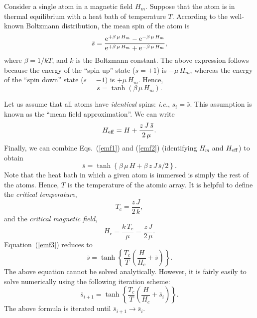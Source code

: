 Consider a single atom in a magnetic field $H_m$. Suppose that
the atom is in thermal equilibrium with a heat bath of temperature
$T$. According to the well-known Boltzmann distribution, the mean spin
of the atom is
\begin{equation}
\bar{s } = \frac{{\rm e}^{+\beta\,\mu\,H_m} - {\rm e}^{-\beta\,\mu\,H_m}}
{{\rm e}^{+\beta\,\mu\,H_m} + {\rm e}^{-\beta\,\mu\,H_m}},
\end{equation}
where $\beta = 1/kT$, and $k$ is the Boltzmann constant. The above expression follows because the energy of
the ``spin up'' state ($s=+1$) is $-\mu\,H_m$, whereas the energy of
the ``spin down'' state ($s=-1$) is $+\mu\,H_m$. Hence,
\begin{equation}\label{emf1}
\bar{s} = \tanh(\beta\,\mu\,H_m).
\end{equation}

Let us assume that all atoms have {\em identical} spins: {\em i.e.}, $s_i=\bar{s}$. 
This assumption is known as the ``mean field approximation''.
We can write
\begin{equation}\label{emf2}
H_{\rm eff} = H + \frac{z\,J\,\bar{s}}{2\,\mu}.
\end{equation}
Finally, we can combine Eqs.~(\ref{emf1}) and (\ref{emf2}) (identifying  $H_m$ and $H_{\rm eff}$)
to obtain
\begin{equation}\label{emf3}
\bar{s} = \tanh\left\{\beta\,\mu\,H + \beta\,z\,J\,\bar{s}/2\right\}.
\end{equation}
Note that  the heat bath in which a given atom is immersed is simply the
rest of the atoms. Hence, $T$ is the temperature of the atomic array.
It is helpful to define the {\em critical temperature}, 
\begin{equation}
T_c = \frac{z\,J}{2\,k},
\end{equation}
and the {\em critical magnetic field},
\begin{equation}
H_c = \frac{k\,T_c}{\mu} = \frac{z\,J}{2\,\mu}.
\end{equation}
Equation~(\ref{emf3}) reduces to
\begin{equation}
\bar{s} = \tanh\left\{\frac{T_c}{T}\left(\frac{H}{H_c} + \bar{s}\right)\right\}.
\end{equation}
The above equation cannot be solved analytically. However, it is fairly
easily to solve numerically using the following iteration scheme:
\begin{equation}\label{eiter}
\bar{s}_{i+1} = \tanh\left\{\frac{T_c}{T}\left(\frac{H}{H_c} + \bar{s}_i\right)\right\}.
\end{equation}
The above formula is iterated until $\bar{s}_{i+1}\rightarrow \bar{s}_i$. 

